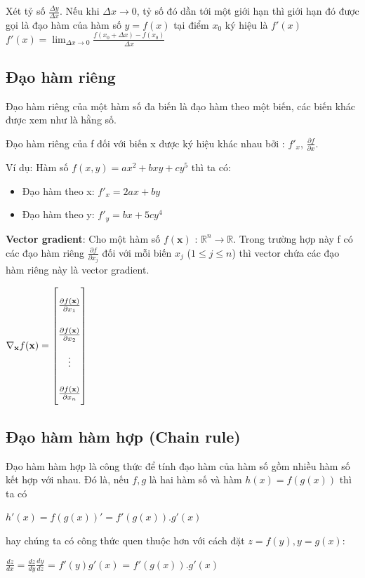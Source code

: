 Xét tỷ số ${  {\frac {\Delta y}{\Delta x}}}$. Nếu khi $  \Delta x\rightarrow0$, tỷ số đó dần tới một giới hạn thì giới hạn đó được gọi là đạo hàm của hàm số $  y=f(x)$ tại điểm $  x_0$ ký hiệu là ${  f'(x)}$\\

${  f'(x)=\lim _{\Delta x\rightarrow 0}{\frac {f(x_{0}+\Delta x)-f(x_{0})}{\Delta x}}}  $
\subsection{Đạo hàm riêng}
Đạo hàm riêng của một hàm số đa biến là đạo hàm theo một biến, các biến khác được xem như là hằng số. \par
Đạo hàm riêng của f đối với biến x được ký hiệu khác nhau bởi : ${  f'_x }$,  ${  \frac{\partial f}{\partial x} }.$\par
Ví dụ: Hàm số $f(x,y) = ax^2 + bxy + cy^5$ thì ta có:
\begin{itemize}
\setlength{\itemindent}{10mm}
	\item Đạo hàm theo x: ${  f'_x = 2ax +by}$
	\item Đạo hàm theo y: ${  f'_y = bx +5cy^4}$	
\end{itemize}

\textbf{Vector gradient}:
Cho một hàm số $f(\textbf{x})$ : $\mathbb{R}^n \rightarrow \mathbb{R}$. Trong trường hợp này f có các đạo hàm riêng $   \frac{\partial f}{\partial x_j}$ đối với mỗi biến $ x_j$ ($1\leq j \leq n$) thì vector chứa các đạo hàm riêng này là vector gradient.\par
\begin{center}

$ \nabla_\textbf{x}f(\textbf{x}) =
\renewcommand{\arraystretch}{2.5} 
\begin{bmatrix}

\frac{\partial f(\textbf{x})}{\partial x_1}\\ \frac{\partial f(\textbf{x})}{\partial x_2} \\ \vdots \\ \frac{\partial f(\textbf{x})}{\partial x_n}
\end{bmatrix}  $
\end{center}

\subsection{Đạo hàm hàm hợp (Chain rule)}

Đạo hàm hàm hợp là công thức để tính đạo hàm của hàm số gồm nhiều hàm số kết hợp với nhau. Đó là, nếu $f, g$ là hai hàm số và hàm $h(x) = f(g(x))$ thì ta có 
\begin{center}
$h'(x) = f(g(x))' = f'(g(x)).g'(x) $

\end{center}
hay chúng ta có công thức quen thuộc hơn với cách đặt $z=f(y), y=g(x)$:
\begin{center}
$\frac{dz}{dx} = \frac{dz}{dy} \frac{dy}{dz}$ = $f'(y)g'(x)$ = $f'(g(x)).g'(x)$
\end{center}

